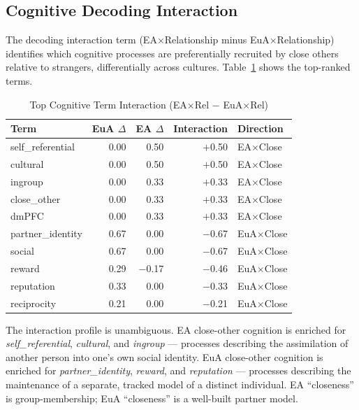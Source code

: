 \documentclass[11pt,a4paper]{article}
\begin{document}
\subsection{Cognitive Decoding Interaction}

The decoding interaction term (EA$\times$Relationship minus EuA$\times$Relationship) identifies
which cognitive processes are preferentially recruited by close others relative to strangers,
differentially across cultures. Table~\ref{tab:decode_interaction} shows the top-ranked terms.

\begin{table}[ht]
\centering\small
\caption{Top Cognitive Term Interaction (EA$\times$Rel $-$ EuA$\times$Rel)}
\label{tab:decode_interaction}
\renewcommand{\arraystretch}{1.2}
\begin{tabular}{lrrrl}
\toprule
\textbf{Term} & \textbf{EuA} $\Delta$ & \textbf{EA} $\Delta$ & \textbf{Interaction} & \textbf{Direction} \\
\midrule
self\_referential  & 0.00 & 0.50 & $+$0.50 & \textcolor{eaRed}{EA$\times$Close} \\
cultural           & 0.00 & 0.50 & $+$0.50 & \textcolor{eaRed}{EA$\times$Close} \\
ingroup            & 0.00 & 0.33 & $+$0.33 & \textcolor{eaRed}{EA$\times$Close} \\
close\_other       & 0.00 & 0.33 & $+$0.33 & \textcolor{eaRed}{EA$\times$Close} \\
dmPFC              & 0.00 & 0.33 & $+$0.33 & \textcolor{eaRed}{EA$\times$Close} \\
\midrule
partner\_identity  & 0.67 & 0.00 & $-$0.67 & \textcolor{euaBlue}{EuA$\times$Close} \\
social             & 0.67 & 0.00 & $-$0.67 & \textcolor{euaBlue}{EuA$\times$Close} \\
reward             & 0.29 & $-$0.17 & $-$0.46 & \textcolor{euaBlue}{EuA$\times$Close} \\
reputation         & 0.33 & 0.00 & $-$0.33 & \textcolor{euaBlue}{EuA$\times$Close} \\
reciprocity        & 0.21 & 0.00 & $-$0.21 & \textcolor{euaBlue}{EuA$\times$Close} \\
\bottomrule
\end{tabular}
\end{table}

The interaction profile is unambiguous. EA close-other cognition is enriched for
\emph{self\_referential}, \emph{cultural}, and \emph{ingroup} — processes describing
the assimilation of another person into one's own social identity. EuA close-other
cognition is enriched for \emph{partner\_identity}, \emph{reward}, and \emph{reputation}
— processes describing the maintenance of a separate, tracked model of a distinct individual.
EA ``closeness'' is group-membership; EuA ``closeness'' is a well-built partner model.
\end{document}
